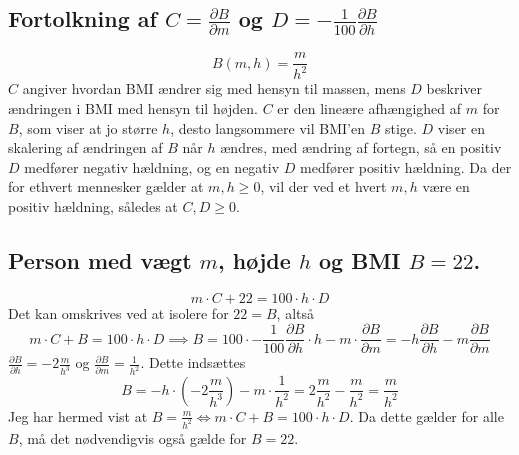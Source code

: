 \documentclass{report}
\begin{document}
\subsection{Fortolkning af $C=\frac{\partial B}{\partial m}$ og $D=-\frac{1}{100}\frac{\partial B}{\partial h}$}
\begin{equation}
    B(m,h)=\frac{m}{h^2}
\end{equation}
$C$ angiver hvordan BMI ændrer sig med hensyn til massen, mens $D$ beskriver ændringen i BMI med hensyn til højden. $C$ er den lineære afhængighed af $m$ for $B$, som viser at jo større $h$, desto langsommere vil BMI'en $B$ stige. $D$ viser en skalering af ændringen af $B$ når $h$ ændres, med ændring af fortegn, så en positiv $D$ medfører negativ hældning, og en negativ $D$ medfører positiv hældning. Da der for ethvert mennesker gælder at $m,h\geq 0$, vil der ved et hvert $m,h$ være en positiv hældning, således at $C,D\geq 0$.
\subsection{Person med vægt $m$, højde $h$ og BMI $B=22$.}
$$m\cdot C+22=100\cdot h\cdot D$$
Det kan omskrives ved at isolere for $22=B$, altså $$m\cdot C+B=100\cdot h\cdot D\implies B=100\cdot-\frac{1}{100}\frac{\partial B}{\partial h}\cdot h-m\cdot\frac{\partial B}{\partial m}=-h\frac{\partial B}{\partial h}-m\frac{\partial B}{\partial m}$$
$\frac{\partial B}{\partial h}=-2\frac{m}{h^3}$ og $\frac{\partial B}{\partial m}=\frac{1}{h^2}$. Dette indsættes
$$B=-h\cdot(-2\frac{m}{h^3})-m\cdot\frac{1}{h^2}=2\frac{m}{h^2}-\frac{m}{h^2}=\frac{m}{h^2}$$
Jeg har hermed vist at $B=\frac{m}{h^2}\Longleftrightarrow m\cdot C+B=100\cdot h\cdot D$. Da dette gælder for alle $B$, må det nødvendigvis også gælde for $B=22$.
\end{document}
